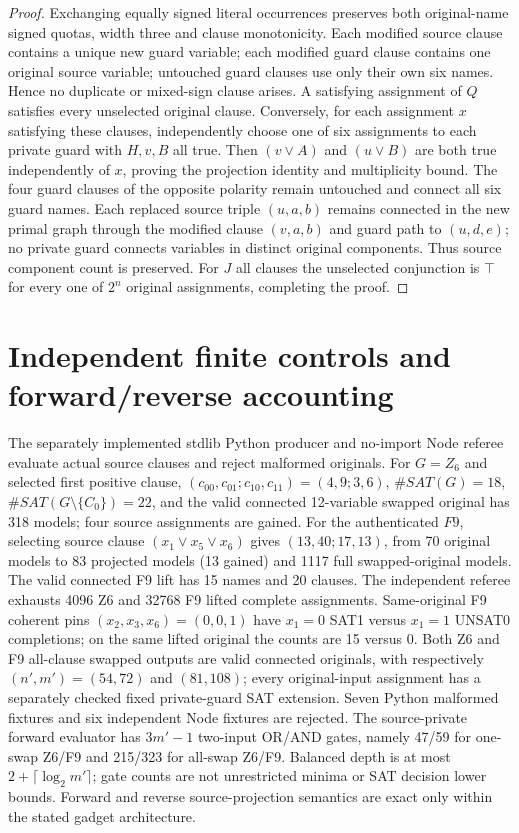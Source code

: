 \documentclass[11pt]{article}
\begin{document}
\begin{proof}
Exchanging equally signed literal occurrences preserves both original-name signed quotas, width three and clause monotonicity. Each modified source clause contains a unique new guard variable; each modified guard clause contains one original source variable; untouched guard clauses use only their own six names. Hence no duplicate or mixed-sign clause arises. A satisfying assignment of $Q$ satisfies every unselected original clause. Conversely, for each assignment $x$ satisfying these clauses, independently choose one of six assignments to each private guard with $H,v,B$ all true. Then $(v\lor A)$ and $(u\lor B)$ are both true independently of $x$, proving the projection identity and multiplicity bound. The four guard clauses of the opposite polarity remain untouched and connect all six guard names. Each replaced source triple $(u,a,b)$ remains connected in the new primal graph through the modified clause $(v,a,b)$ and guard path to $(u,d,e)$; no private guard connects variables in distinct original components. Thus source component count is preserved. For $J$ all clauses the unselected conjunction is $\top$ for every one of $2^n$ original assignments, completing the proof.
\end{proof}
\section{Independent finite controls and forward/reverse accounting}
The separately implemented stdlib Python producer and no-import Node referee evaluate actual source clauses and reject malformed originals. For $G=Z_6$ and selected first positive clause, $(c_{00},c_{01};c_{10},c_{11})=(4,9;3,6)$, $\#SAT(G)=18$, $\#SAT(G\setminus\{C_0\})=22$, and the valid connected 12-variable swapped original has 318 models; four source assignments are gained. For the authenticated $F9$, selecting source clause $(x_1\lor x_5\lor x_6)$ gives $(13,40;17,13)$, from 70 original models to 83 projected models (13 gained) and 1117 full swapped-original models. The valid connected F9 lift has 15 names and 20 clauses. The independent referee exhausts 4096 Z6 and 32768 F9 lifted complete assignments. Same-original F9 coherent pins $(x_2,x_3,x_6)=(0,0,1)$ have $x_1=0$ SAT1 versus $x_1=1$ UNSAT0 completions; on the same lifted original the counts are 15 versus 0. Both Z6 and F9 all-clause swapped outputs are valid connected originals, with respectively $(n',m')=(54,72)$ and $(81,108)$; every original-input assignment has a separately checked fixed private-guard SAT extension. Seven Python malformed fixtures and six independent Node fixtures are rejected. The source-private forward evaluator has $3m'-1$ two-input OR/AND gates, namely 47/59 for one-swap Z6/F9 and 215/323 for all-swap Z6/F9. Balanced depth is at most $2+\lceil\log_2 m'\rceil$; gate counts are not unrestricted minima or SAT decision lower bounds. Forward and reverse source-projection semantics are exact only within the stated gadget architecture.
\end{document}
